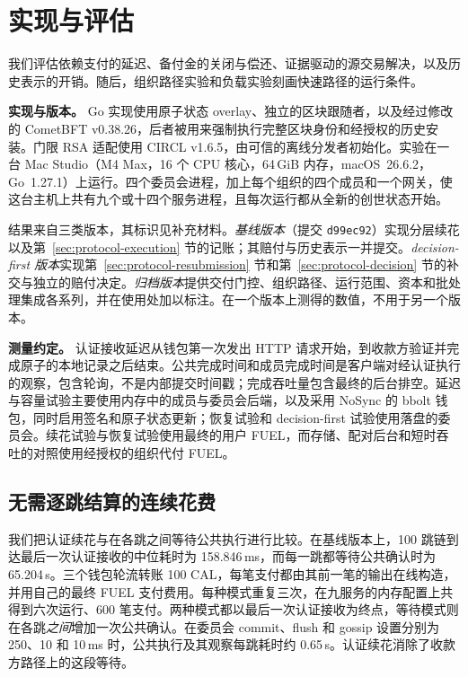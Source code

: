 
\section{实现与评估}
\label{sec:evaluation}

我们评估依赖支付的延迟、备付金的关闭与偿还、证据驱动的源交易解决，以及历史表示的开销。随后，组织路径实验和负载实验刻画快速路径的运行条件。

\noindent\textbf{实现与版本。}
Go 实现使用原子状态 overlay、独立的区块跟随者，以及经过修改的 CometBFT v0.38.26，后者被用来强制执行完整区块身份和经授权的历史安装。门限 RSA 适配使用 CIRCL v1.6.5，由可信的离线分发者初始化。实验在一台 Mac Studio（M4 Max，16 个 CPU 核心，64\,GiB 内存，macOS~26.6.2，Go~1.27.1）上运行。四个委员会进程，加上每个组织的四个成员和一个网关，使这台主机上共有九个或十四个服务进程，且每次运行都从全新的创世状态开始。

结果来自三类版本，其标识见补充材料。\emph{基线版本}（提交 \texttt{d99ec92}）实现分层续花以及第~\ref{sec:protocol-execution} 节的记账；其赔付与历史表示一并提交。\emph{decision-first 版本}实现第~\ref{sec:protocol-resubmission} 节和第~\ref{sec:protocol-decision} 节的补交与独立的赔付决定。\emph{归档版本}提供交付门控、组织路径、运行范围、资本和批处理集成各系列，并在使用处加以标注。在一个版本上测得的数值，不用于另一个版本。

\noindent\textbf{测量约定。}
认证接收延迟从钱包第一次发出 HTTP 请求开始，到收款方验证并完成原子的本地记录之后结束。公共完成时间和成员完成时间是客户端对经认证执行的观察，包含轮询，不是内部提交时间戳；完成吞吐量包含最终的后台排空。延迟与容量试验主要使用内存中的成员与委员会后端，以及采用 NoSync 的 bbolt 钱包，同时启用签名和原子状态更新；恢复试验和 decision-first 试验使用落盘的委员会。续花试验与恢复试验使用最终的用户 FUEL，而存储、配对后台和短时吞吐的对照使用经授权的组织代付 FUEL。

\subsection{无需逐跳结算的连续花费}
\label{sec:eval-continuation}

我们把认证续花与在各跳之间等待公共执行进行比较。在基线版本上，100 跳链到达最后一次认证接收的中位耗时为 158.846\,ms，而每一跳都等待公共确认时为 65.204\,s。三个钱包轮流转账 100 CAL，每笔支付都由其前一笔的输出在线构造，并用自己的最终 FUEL 支付费用。每种模式重复三次，在九服务的内存配置上共得到六次运行、600 笔支付。两种模式都以最后一次认证接收为终点，等待模式则在各跳\emph{之间}增加一次公共确认。在委员会 commit、flush 和 gossip 设置分别为 250、10 和 10\,ms 时，公共执行及其观察每跳耗时约 0.65\,s。认证续花消除了收款方路径上的这段等待。

